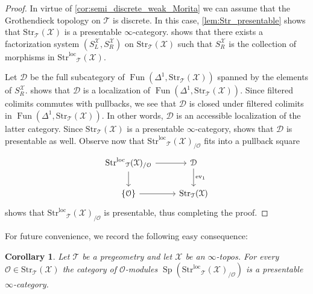 \documentclass[12pt,a4paper,reqno]{amsart}
\theoremstyle{plain}
\newtheorem{cor}[thm]{Corollary}
\theoremstyle{definition}
\theoremstyle{remark}
\numberwithin{equation}{section}
\begin{document}
\begin{proof}
	In virtue of \cref{cor:semi_discrete_weak_Morita} we can assume that the Grothendieck topology on ${\mathcal T}$ is discrete. In this case, \cref{lem:Str_presentable} shows that ${\mathrm{Str}}_{\mathcal T}({\mathcal X})$ is a presentable $\infty$-category.
	\cite[Theorem 1.3.1]{DAG-V} shows that there exists a factorization system $(S^{\mathcal X}_L, S^{\mathcal X}_R)$ on ${\mathrm{Str}}_{\mathcal T}({\mathcal X})$ such that $S^{\mathcal X}_R$ is the collection of morphisms in ${\mathrm{Str}^\mathrm{loc}}_{\mathcal T}({\mathcal X})$.
	
	Let ${\mathcal D}$ be the full subcategory of $\operatorname{Fun}(\Delta^1, {\mathrm{Str}}_{\mathcal T}({\mathcal X}))$ spanned by the elements of $S^{\mathcal X}_R$.
	\cite[Lemma 5.2.8.19]{HTT} shows that ${\mathcal D}$ is a localization of $\operatorname{Fun}(\Delta^1, {\mathrm{Str}}_{\mathcal T}({\mathcal X}))$. Since filtered colimits commutes with pullbacks, we see that ${\mathcal D}$ is closed under filtered colimits in $\operatorname{Fun}(\Delta^1, {\mathrm{Str}}_{\mathcal T}({\mathcal X}))$. In other words, ${\mathcal D}$ is an accessible localization of the latter category. Since ${\mathrm{Str}}_{\mathcal T}({\mathcal X})$ is a presentable $\infty$-category, \cite[Proposition 5.5.1.2]{HTT} shows that ${\mathcal D}$ is presentable as well.
	Observe now that ${\mathrm{Str}^\mathrm{loc}}_{\mathcal T}({\mathcal X})_{/{\mathcal O}}$ fits into a pullback square
	\[ \begin{tikzcd}
	{\mathrm{Str}^\mathrm{loc}}_{\mathcal T}({\mathcal X})_{/{\mathcal O}} \arrow{r} \arrow{d} & {\mathcal D} \arrow{d}{\mathrm{ev}_1} \\
	\{{\mathcal O}\} \arrow{r} & {\mathrm{Str}}_{\mathcal T}({\mathcal X})
	\end{tikzcd} \]
	\cite[Theorem 5.5.3.18]{HTT} shows that ${\mathrm{Str}^\mathrm{loc}}_{\mathcal T}({\mathcal X})_{/{\mathcal O}}$ is presentable, thus completing the proof.
\end{proof}

For future convenience, we record the following easy consequence:

\begin{cor}
	Let ${\mathcal T}$ be a pregeometry and let ${\mathcal X}$ be an $\infty$-topos. For every ${\mathcal O} \in {\mathrm{Str}}_{\mathcal T}({\mathcal X})$ the category of ${\mathcal O}$-modules $\operatorname{Sp}({\mathrm{Str}^\mathrm{loc}}_{\mathcal T}({\mathcal X})_{/{\mathcal O}})$ is a presentable $\infty$-category.
\end{cor}
\end{document}
